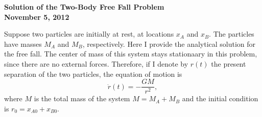 \documentclass[12pt]{article}
\begin{document}
  \begin{center}
    \textbf{Solution of the Two-Body Free Fall Problem}\\
    \textbf{November 5, 2012}
  \end{center}

  Suppose two particles are initially at rest, at locations $x_A$ and $x_B$. The particles have masses $M_A$ and $M_B$, respectively. Here I provide the analytical solution for the free fall. The center of mass of this system stays stationaary in this problem, since there are no external forces. Therefore, if I denote by $r(t)$ the present separation of the two particles, the equation of motion is
  \begin{equation}
    \ddot{r}(t) = - \frac{GM}{r^2},
  \end{equation}
  where $M$ is the total mass of the system $M = M_A + M_B$ and the initial condition is $r_0 = x_{A0} + x_{B0}$.
\end{document}
